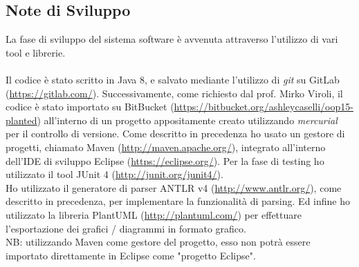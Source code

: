 \documentclass{article}
\begin{document}
  \subsection{Note di Sviluppo}
  La fase di sviluppo del sistema software è avvenuta attraverso l'utilizzo di vari tool e librerie.\\
  \\Il codice è stato scritto in Java 8, e salvato mediante l'utilizzo di \textit{git} su GitLab (\url{https://gitlab.com/}). Successivamente, come richiesto dal prof. Mirko Viroli,
  il codice è stato importato su BitBucket (\url{https://bitbucket.org/ashleycaselli/oop15-planted}) all'interno di un progetto appositamente creato
  utilizzando \textit{mercurial} per il controllo di versione.
  Come descritto in precedenza ho usato un gestore di progetti, chiamato Maven (\url{http://maven.apache.org/}), integrato all'interno dell'IDE di sviluppo Eclipse
  (\url{https://eclipse.org/}). Per la fase di testing ho utilizzato il tool JUnit 4 (\url{http://junit.org/junit4/}).\\
  Ho utilizzato il generatore di parser ANTLR v4 (\url{http://www.antlr.org/}), come descritto in precedenza, per implementare la funzionalità di parsing.
  Ed infine ho utilizzato la libreria PlantUML (\url{http://plantuml.com/}) per effettuare l'esportazione dei grafici / diagrammi in formato grafico.\\
  NB: utilizzando Maven come gestore del progetto, esso non potrà essere importato direttamente in Eclipse come "progetto Eclipse".
  \newpage
\end{document}
